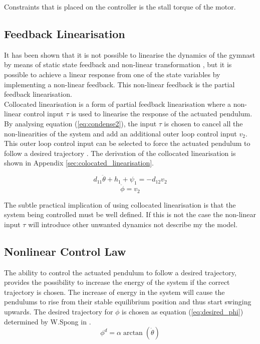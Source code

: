 Constraints that is placed on the controller is the stall torque of the motor. 

\subsection{Feedback Linearisation}
It has been shown that it is not possible to linearise the dynamics of the gymnast by means of static state feedback and non-linear transformation \cite{murray}, but it is possible to achieve a linear response from one of the state variables by implementing a non-linear feedback. This non-linear feedback is the partial feedback linearisation.\\

Collocated linearisation is a form of partial feedback linearisation where a non-linear control input $\tau$ is used to linearise the response of the actuated pendulum. By analysing equation (\ref{eq:condense2}), the input $\tau$ is chosen to cancel all the non-linearities of the system and add an additional outer loop control input $v_{2}$. This outer loop control input can be selected to force the actuated pendulum to follow a desired trajectory \citep{spong_swingup}. The derivation of the collocated linearisation is shown in Appendix \ref{sec:colocated_linearisation}.

\begin{equation} \label{eq:collocated_lin1}
d_{11}\ddot{\theta} + h_{1} + \psi_{1} = -d_{12}v_{2}
\end{equation}
\begin{equation} \label{eq:collocated_lin2}
\ddot{\phi} = v_{2}
\end{equation}

The subtle practical implication of using collocated linearisation is that the system being controlled must be well defined. If this is not the case the non-linear input $\tau$ will introduce other unwanted dynamics not describe my the model.

\subsection{Nonlinear Control Law}

The ability to control the actuated pendulum to follow a desired trajectory, provides the possibility to increase the energy of the system if the correct trajectory is chosen. The increase of energy in the system will cause the pendulums to rise from their stable equilibrium position and thus start swinging upwards. The desired trajectory for ${\phi}$ is chosen as equation (\ref{eq:desired_phi}) determined by W.Spong in \citep{spong_swingup}.
\begin{equation} \label{eq:desired_phi}
\phi^{d} =  \alpha \arctan(\dot{\theta})
\end{equation}


